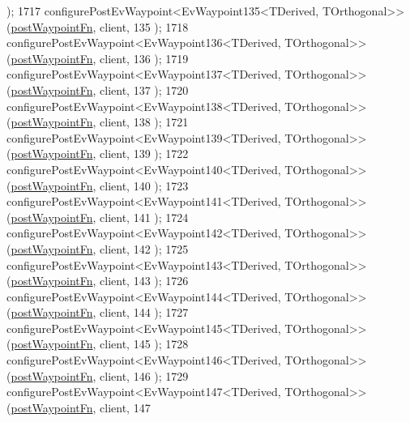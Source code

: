 \begin{DoxyCode}
      );
1717     configurePostEvWaypoint<EvWaypoint135<TDerived, TOrthogonal>>(\hyperlink{classcl__move__base__z_1_1WaypointEventDispatcher_a964a57fcce5d48ec60243230722d8dd7}{postWaypointFn}, client, 135
      );
1718     configurePostEvWaypoint<EvWaypoint136<TDerived, TOrthogonal>>(\hyperlink{classcl__move__base__z_1_1WaypointEventDispatcher_a964a57fcce5d48ec60243230722d8dd7}{postWaypointFn}, client, 136
      );
1719     configurePostEvWaypoint<EvWaypoint137<TDerived, TOrthogonal>>(\hyperlink{classcl__move__base__z_1_1WaypointEventDispatcher_a964a57fcce5d48ec60243230722d8dd7}{postWaypointFn}, client, 137
      );
1720     configurePostEvWaypoint<EvWaypoint138<TDerived, TOrthogonal>>(\hyperlink{classcl__move__base__z_1_1WaypointEventDispatcher_a964a57fcce5d48ec60243230722d8dd7}{postWaypointFn}, client, 138
      );
1721     configurePostEvWaypoint<EvWaypoint139<TDerived, TOrthogonal>>(\hyperlink{classcl__move__base__z_1_1WaypointEventDispatcher_a964a57fcce5d48ec60243230722d8dd7}{postWaypointFn}, client, 139
      );
1722     configurePostEvWaypoint<EvWaypoint140<TDerived, TOrthogonal>>(\hyperlink{classcl__move__base__z_1_1WaypointEventDispatcher_a964a57fcce5d48ec60243230722d8dd7}{postWaypointFn}, client, 140
      );
1723     configurePostEvWaypoint<EvWaypoint141<TDerived, TOrthogonal>>(\hyperlink{classcl__move__base__z_1_1WaypointEventDispatcher_a964a57fcce5d48ec60243230722d8dd7}{postWaypointFn}, client, 141
      );
1724     configurePostEvWaypoint<EvWaypoint142<TDerived, TOrthogonal>>(\hyperlink{classcl__move__base__z_1_1WaypointEventDispatcher_a964a57fcce5d48ec60243230722d8dd7}{postWaypointFn}, client, 142
      );
1725     configurePostEvWaypoint<EvWaypoint143<TDerived, TOrthogonal>>(\hyperlink{classcl__move__base__z_1_1WaypointEventDispatcher_a964a57fcce5d48ec60243230722d8dd7}{postWaypointFn}, client, 143
      );
1726     configurePostEvWaypoint<EvWaypoint144<TDerived, TOrthogonal>>(\hyperlink{classcl__move__base__z_1_1WaypointEventDispatcher_a964a57fcce5d48ec60243230722d8dd7}{postWaypointFn}, client, 144
      );
1727     configurePostEvWaypoint<EvWaypoint145<TDerived, TOrthogonal>>(\hyperlink{classcl__move__base__z_1_1WaypointEventDispatcher_a964a57fcce5d48ec60243230722d8dd7}{postWaypointFn}, client, 145
      );
1728     configurePostEvWaypoint<EvWaypoint146<TDerived, TOrthogonal>>(\hyperlink{classcl__move__base__z_1_1WaypointEventDispatcher_a964a57fcce5d48ec60243230722d8dd7}{postWaypointFn}, client, 146
      );
1729     configurePostEvWaypoint<EvWaypoint147<TDerived, TOrthogonal>>(\hyperlink{classcl__move__base__z_1_1WaypointEventDispatcher_a964a57fcce5d48ec60243230722d8dd7}{postWaypointFn}, client, 147

\end{DoxyCode}
